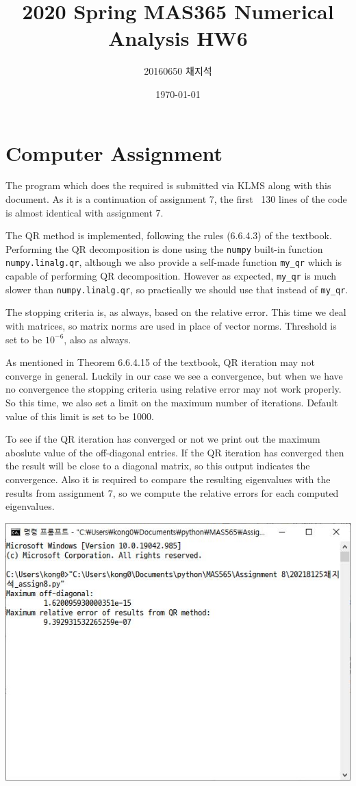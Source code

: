 \documentclass{article}
\title{2020 Spring MAS365 Numerical Analysis HW6}
\author{20160650 채지석}
\date{\today}
\begin{document}
\section*{Computer Assignment}
The program which does the required is submitted via KLMS along with this document. As it is a continuation of assignment 7, the first ~130 lines of the code is almost identical with assignment 7.

The QR method is implemented, following the rules (6.6.4.3) of the textbook. Performing the QR decomposition is done using the \texttt{numpy} built-in function \texttt{numpy.linalg.qr}, although we also provide a self-made function \texttt{my\_qr} which is capable of performing QR decomposition. However as expected, \texttt{my\_qr} is much slower than \texttt{numpy.linalg.qr}, so practically we should use that instead of \texttt{my\_qr}.

The stopping criteria is, as always, based on the relative error. This time we deal with matrices, so matrix norms are used in place of vector norms. Threshold is set to be $10^{-6}$, also as always.

As mentioned in Theorem 6.6.4.15 of the textbook, QR iteration may not converge in general. Luckily in our case we see a convergence, but when we have no convergence the stopping criteria using relative error may not work properly. So this time, we also set a limit on the maximum number of iterations. Default value of this limit is set to be 1000.

To see if the QR iteration has converged or not we print out the maximum aboslute value of the off-diagonal entries. If the QR iteration has converged then the result will be close to a diagonal matrix, so this output indicates the convergence. Also it is required to compare the resulting eigenvalues with the results from assignment 7, so we compute the relative errors for each computed eigenvalues.

\begin{center}
    \includegraphics[width=0.75\linewidth]{console.JPG}
\end{center} 
\end{document}
